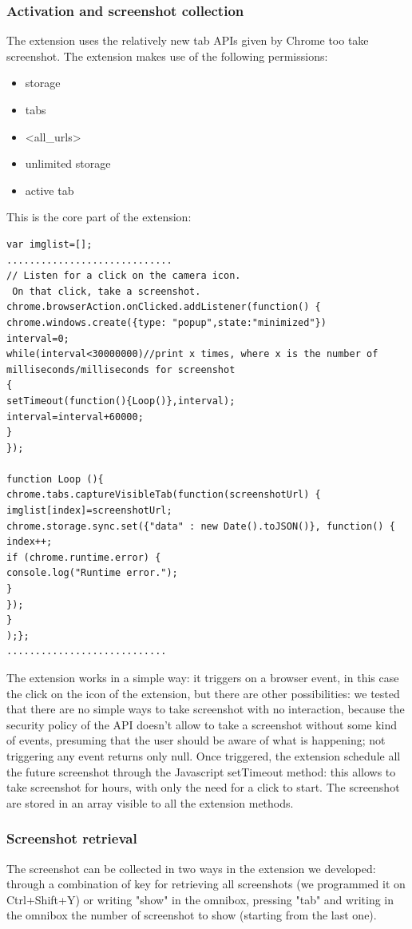 \documentclass[12pt]{article}
\begin{document}
\begin{multicols}{2}
\subsubsection*{Activation and screenshot collection}
The extension uses the relatively new tab APIs given by Chrome too take screenshot.
The extension makes use of the following permissions:\begin{itemize}
	\item storage
	\item tabs
	\item <all\_urls>
	\item unlimited storage
	\item active tab
	\end{itemize}
	This is the core part of the extension:
	\begin{lstlisting}
var imglist=[];
.............................
// Listen for a click on the camera icon.
 On that click, take a screenshot.
chrome.browserAction.onClicked.addListener(function() {
chrome.windows.create({type: "popup",state:"minimized"})
interval=0;
while(interval<30000000)//print x times, where x is the number of milliseconds/milliseconds for screenshot
{
setTimeout(function(){Loop()},interval);    
interval=interval+60000;
}
});

function Loop (){
chrome.tabs.captureVisibleTab(function(screenshotUrl) {
imglist[index]=screenshotUrl;
chrome.storage.sync.set({"data" : new Date().toJSON()}, function() {
index++;
if (chrome.runtime.error) {
console.log("Runtime error.");
}
});      
}
);};
............................
	\end{lstlisting}
	 The extension works in a simple way: it triggers on a browser event, in this case the click on the icon of the extension, but there are other possibilities: we tested that there are no simple ways to take screenshot with no interaction, because the security policy of the API doesn't allow to take a screenshot without some kind of events, presuming that the user should be aware of what is happening; not triggering any event returns only null.
Once triggered, the extension schedule all the future screenshot through the Javascript setTimeout method: this allows to take screenshot for hours, with only the need for a click to start.
The screenshot are stored in an array visible to all the extension methods.
\subsubsection*{Screenshot retrieval}
The screenshot can be collected in two ways in the extension we developed:
through a combination of key for retrieving all screenshots (we programmed it on Ctrl+Shift+Y) or writing "show" in the omnibox, pressing "tab" and writing in the omnibox the number of screenshot to show (starting from the last one).

\end{multicols}
\end{document}
